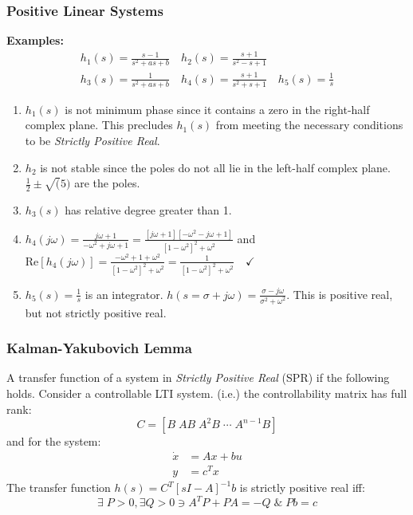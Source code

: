 \documentclass[11pt,handout]{beamer}   %
\begin{document}
\begin{frame}
\frametitle{Positive Linear Systems}
\small
\textbf{Examples:}
\begin{equation*}
\begin{aligned}
h_1(s) = \frac{s-1}{s^2 + as +b} \quad h_2(s) = \frac{s+1}{s^2 - s +1} \\
h_3(s) = \frac{1}{s^2 + as + b} \quad h_4(s) = \frac{s+1}{s^2 + s+ 1} \quad h_5(s) = \frac{1}{s}
\end{aligned}
\end{equation*}
\begin{enumerate}
\item $h_1(s)$ is not minimum phase since it contains a zero in the right-half complex plane. This precludes $h_1(s)$ from meeting the necessary conditions to be \textit{Strictly Positive Real}.\\
\item $h_2$ is not stable since the poles do not all lie in the left-half complex plane. $\frac{1}{2} \pm \sqrt(5)$ are the poles.
\item $h_3(s)$ has relative degree greater than 1.
\item $h_4(j \omega) = \frac{j \omega + 1}{-\omega^2 + j\omega +1} = \frac{[j \omega + 1][- \omega^2 - j \omega + 1]}{[1 - \omega^2]^2 + \omega^2}$ and $\text{Re}[h_4(j\omega)] = \frac{-\omega^2 + 1 + \omega^2}{[1 - \omega^2]^2 + \omega^2} = \frac{1}{[1 - \omega^2]^2 + \omega^2} \quad \checkmark$
\item $h_5(s) = \frac{1}{s}$ is an integrator. $h(s = \sigma + j\omega) = \frac{\sigma - j\omega}{\sigma^2 + \omega^2}$. This is positive real, but not strictly positive real.
\end{enumerate}
\end{frame}

\begin{frame}
\frametitle{Kalman-Yakubovich Lemma}
\small
A transfer function of a system in \textit{Strictly Positive Real} (SPR) if the following holds. Consider a controllable LTI system. (i.e.) the controllability matrix has full rank: 
\begin{equation*}
C = [B \;  AB \;  A^2B \;  \cdots \; A^{n-1}B]
\end{equation*}
and for the system:
\begin{equation*}
\begin{aligned}
\dot{x} &= Ax + bu\\
y &= c^T x
\end{aligned}
\end{equation*}
The transfer function $h(s) = C^T[sI - A]^{-1}b$ is strictly positive real iff:
\begin{equation*}
\exists \; P>0, \exists Q >0 \ni A^T P + P A = -Q \; \& \; Pb = c
\end{equation*}
\end{frame}
\end{document}
